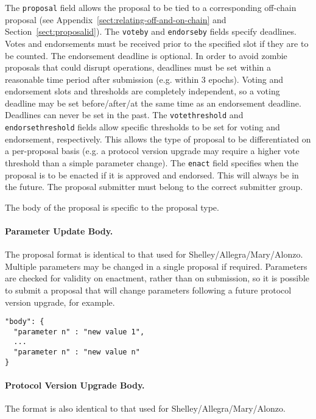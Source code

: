The \texttt{proposal} field allows the proposal to be tied to a corresponding off-chain proposal (see Appendix~\ref{sect:relating-off-and-on-chain} and Section~\ref{sect:proposalid}).  The \texttt{voteby} and \texttt{endorseby} fields specify deadlines.
Votes and endorsements must be received prior to the specified slot if they are to be counted.  The endorsement deadline is optional.
In order to avoid zombie proposals that could disrupt operations, deadlines must be set within a reasonable time period after submission (e.g. within 3 epochs).
Voting and endorsement slots and thresholds are completely independent, so a voting deadline may be set before/after/at the same time as an endorsement deadline.
Deadlines can never be set in the past.
%
The \texttt{votethreshold} and \texttt{endorsethreshold} fields allow specific thresholds to be set for voting and endorsement, respectively.  This allows the type of proposal to be differentiated on a per-proposal basis
(e.g. a protocol version upgrade may require a higher vote threshold than a simple parameter change).
%
The \texttt{enact} field specifies when the proposal is to be enacted if it is approved and endorsed.  This will always be in the future.
%
The proposal submitter must belong to the correct submitter group.  

The body of the proposal is specific to the proposal type.

\newpage
\paragraph{Parameter Update Body.}  The proposal format is identical to that used for Shelley/Allegra/Mary/Alonzo.   Multiple parameters may be changed in a single proposal if required.
Parameters are checked for validity on enactment, rather than on submission, so it is possible to submit a proposal that will change parameters following a future protocol version upgrade, for example.


\begin{verbatim}
"body": {
  "parameter n" : "new value 1",
  ...
  "parameter n" : "new value n"
}
\end{verbatim}

\paragraph{Protocol Version Upgrade Body.}  The format is also identical to that used for Shelley/Allegra/Mary/Alonzo.


